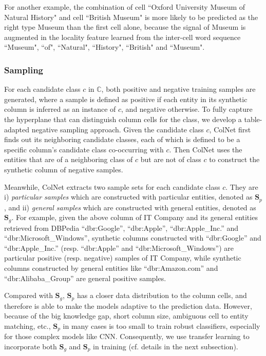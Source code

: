 \documentclass[letterpaper]{article}
\newcommand{\rv}[1]{{\color{black}#1}}
\newcommand{\camera}[1]{{\color{black}#1}}
\newcommand{\ColNet}{\textsf{ColNet}\xspace}
\begin{document}
\rv{For another example, the combination of cell ``Oxford University Museum of Natural History" and cell ``British Museum" 
is more likely to be predicted as the right type Museum than the first cell alone,
because the signal of Museum is augmented in the locality feature learned from the inter-cell word sequence ``Museum", ``of", ``Natural", ``History", ``British" and ``Museum".
}

\subsubsection{Sampling}
For each candidate class $c$ in $\mathbb{C}$, 
both \rv{positive and negative training samples are generated,
where a sample is defined as positive
if each entity in its synthetic column is inferred as an instance of $c$,
and negative otherwise.}
To fully capture the hyperplane that can distinguish column cells for the class,
we develop a table-adapted negative sampling approach.
Given the candidate class $c$,
\ColNet first finds out its neighboring candidate classes, 
\rv{each of which is defined to be 
a specific column's candidate class co-occurring with $c$.
}
Then \ColNet uses the entities that are of a neighboring class of $c$ but are not of class $c$ to construct the synthetic column of negative samples. 


Meanwhile, 
\ColNet extracts two sample sets for each candidate class $c$.
They are i) \textit{particular samples} which are constructed with particular entities, denoted as $\bm{S}_p$,
and ii) \textit{general samples} which are constructed with general entities, 
denoted as $\bm{S}_g$.
\rv{For example, given the above column of IT Company and its general entities retrieved from DBPedia ``dbr:Google'', ``dbr:Apple'', ``dbr:Apple\_Inc.'' and ``dbr:Microsoft\_Windows'',
synthetic columns constructed with ``dbr:Google'' and ``dbr:Apple\_Inc.'' (resp. ``dbr:Apple'' and ``dbr:Microsoft\_Windows'') are particular positive (resp. negative) samples of IT Company,
while synthetic columns constructed by general entities like ``dbr:Amazon.com'' and ``dbr:Alibaba\_Group'' are general positive samples.}


Compared with $\bm{S}_g$, 
$\bm{S}_p$ has a closer data distribution to the column cells,
\camera{and therefore is able to}
make the models adaptive to the prediction data.
However, because of the
big knowledge gap, short column size, ambiguous cell to entity matching, etc., 
$\bm{S}_p$ in many cases is too small to train robust classifiers, 
especially for those complex models like CNN.
\camera{Consequently}, we use transfer learning to incorporate both $\bm{S}_g$ and $\bm{S}_p$ in training (cf. details in the next subsection).  
\end{document}
